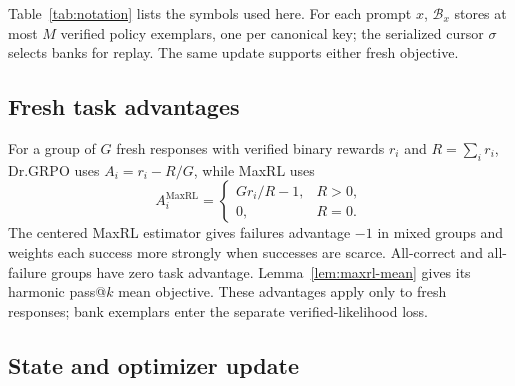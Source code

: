 \documentclass{article}
\newcommand{\1}{\mathbf 1}
\theoremstyle{remark}
\theoremstyle{definition}
\theoremstyle{plain}
\begin{document}
Table~\ref{tab:notation} lists the symbols used here.
For each prompt $x$, $\mathcal B_x$ stores at most $M$ verified policy
exemplars, one per canonical key; the serialized cursor $\sigma$ selects
banks for replay. The same update supports either fresh objective.


\subsection{Fresh task advantages}
\label{app:binary-maxrl}

For a group of $G$ fresh responses with verified binary rewards $r_i$ and
$R=\sum_i r_i$, Dr.GRPO uses $A_i=r_i-R/G$, while MaxRL uses
\[
 A_i^{\mathrm{MaxRL}}=
 \begin{cases}
 G r_i/R-1, & R>0,\\
 0, & R=0.
 \end{cases}
\]
The centered MaxRL estimator \citep{tajwar2026maxrl} gives failures advantage
$-1$ in mixed groups and weights each success more strongly when successes
are scarce. All-correct and all-failure groups have zero task advantage.
Lemma~\ref{lem:maxrl-mean} gives its harmonic pass@\(k\) mean objective.
These advantages apply only to fresh responses; bank exemplars enter the
separate verified-likelihood loss.

\subsection{State and optimizer update}
\label{app:algorithm-update}
\end{document}
